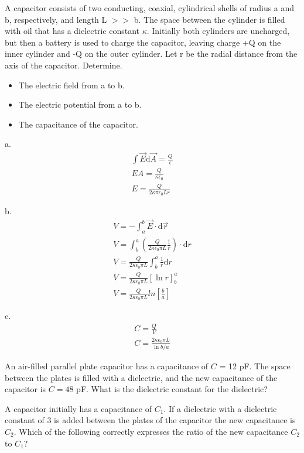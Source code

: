 \documentclass[../em.tex]{subfiles}
\begin{document}
\begin{example}
    A capacitor consists of two conducting, coaxial, cylindrical shells of radius a and b, respectively,
    and length L $>>$ b. The space between the cylinder is filled with oil that has a dielectric constant $\kappa$.
    Initially both cylinders are uncharged, but then a battery is used to charge the capacitor, leaving charge +Q 
    on the inner cylinder and -Q on the outer cylinder. Let r be the radial distance from the axis of the capacitor.
    Determine.
    \begin{itemize}
        \item The electric field from a to b.
        \item The electric potential from a to b.
        \item The capacitance of the capacitor.
    \end{itemize}

    a.
    \begin{align*}
        \int \vec{E}\mathrm{d}\vec{A}=\frac{Q}{\epsilon}\\ 
        EA = \frac{Q}{\kappa\epsilon_0}\\
        E = \frac{Q}{2\kappa \pi\epsilon_0 L r}
    \end{align*} 

    b.
    \begin{align*}
        V = -\int_a^b \vec{E}\cdot\mathrm{d}\vec{r}\\
        V = \int^a_b \left(\frac{Q}{2\kappa\epsilon_0 \pi L}\frac{1}{r}\right)\cdot \mathrm{d}r\\
        V = \frac{Q}{2\kappa\epsilon_0\pi L}\int_b^a \frac{1}{r}\mathrm{d}r\\
        V = \frac{Q}{2\kappa\epsilon_0\pi L}[\ln r]^a_b \\
        V = \frac{Q}{2\kappa\epsilon_0\pi L}ln\left[\frac{b}{a}\right]
    \end{align*}

    c.
    \begin{align*}
        C = \frac{Q}{V}\\
        C = \frac{2\kappa \epsilon_0 \pi L}{\ln b/a}
    \end{align*}

\end{example}
\ex An air-filled parallel plate capacitor has a capacitance of $C$ = 12 pF. The space between the plates is filled with a dielectric, and the new capacitance of the capacitor is $C=48$ pF. What is the dielectric constant for the dielectric?

\ex A capacitor initially has a capacitance of $C_1$. If a dielectric with a dielectric constant of 3 is added between the plates of the capacitor the new capacitance is $C_2$. Which of the following correctly expresses the ratio of the new capacitance $C_2$ to $C_1$?
\end{document}
